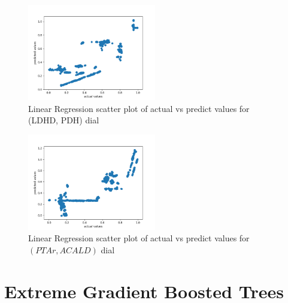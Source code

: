\documentclass[12pt,chapterheads]{ucsd}
\begin{document}
\begin{figure}[h] 
\centering
\includegraphics[width=0.5\textwidth]{LDH_D_PDH_lr}
\caption[Linear Regression scatter plot of actual vs predict values for \string(LDH\textunderscore D, PDH) dial]
{Linear Regression scatter plot of actual vs predict values for \string(LDH\textunderscore D, PDH) dial}
\label{fig:LdhPdhLr}
\end{figure}

\begin{figure}[h] 
\centering
\includegraphics[width=0.5\textwidth]{PTAr_ACALD_lr}
\caption[Linear Regression scatter plot of actual vs predict values for $(PTAr, ACALD)$ dial]
{Linear Regression scatter plot of actual vs predict values for $(PTAr, ACALD)$ dial}
\label{fig:PtarAcaldLr}
\end{figure}


\section{Extreme Gradient Boosted Trees} \label{sec:xgboostRes}
\end{document}
